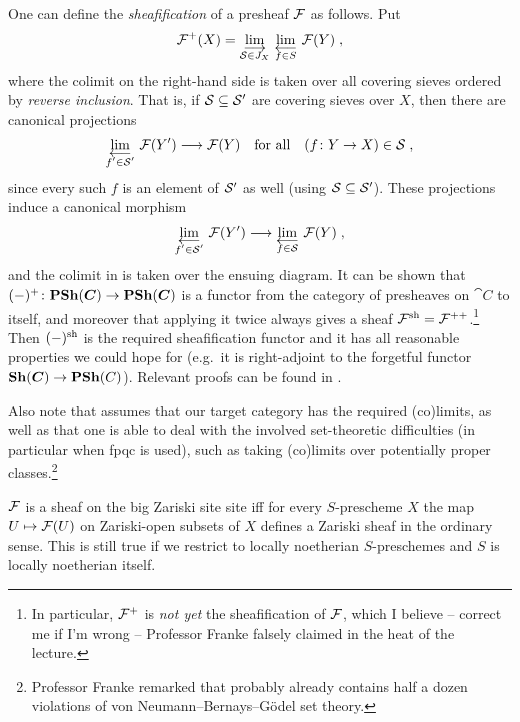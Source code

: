 \documentclass[a4paper,parskip=half,numbers=enddot, DIV=12]{scrreprt}
\begin{document}
\begin{rem}
	One can define the \emph{sheafification} of a presheaf $\mathcal{F}$ as follows. Put
	\begin{align}\lbl{eq:+construction}
		\Ff^+(X)=\colimit[\Ss\in J_X]\limit[f\in S]\Ff(Y)\;,
	\end{align}
	where the colimit on the right-hand side is taken over all covering sieves ordered by \emph{reverse inclusion}. That is, if $\mathcal{S}\subseteq \mathcal{S}'$ are covering sieves over $X$, then there are canonical projections
	\begin{align*}
		\limit[f'\in \Ss']\Ff(Y')\morphism \Ff(Y)\quad\text{for all}\quad(f\colon Y\to X)\in \Ss\;,
	\end{align*}
	since every such $f$ is an element of $\mathcal{S}'$ as well (using $\mathcal{S}\subseteq \mathcal{S}'$). These projections induce a canonical morphism 
	\begin{align*}
		\limit[f'\in\Ss']\Ff(Y')\morphism\limit[f\in \Ss]\Ff(Y)\;,
	\end{align*}
	and the colimit in  is taken over the ensuing diagram. It can be shown that $(-)^+\colon \cat{PSh}(\cat C)\morphism\cat{PSh}(\cat C)$ is a functor from the category of presheaves on $\cat C$ to itself, and moreover that applying it twice always gives a sheaf $\mathcal{F}^{\mathrm{sh}}=\mathcal{F}^{++}$.\footnote{In particular, $\mathcal{F}^+$ is \emph{not yet} the sheafification of $\mathcal{F}$, which  I believe -- correct me if I'm wrong -- Professor Franke falsely claimed in the heat of the lecture.} Then $(-)^{\mathrm{sh}}$ is the required sheafification functor and it has all reasonable properties we could hope for (e.g.\ it is right-adjoint to the forgetful functor $\cat {Sh}(\cat C)\morphism\cat{PSh}(C)$). Relevant proofs can be found in \cite[]{stacks-project}.
	
	Also note that  assumes that our target category has the required (co)limits, as well as that one is able to deal with the involved set-theoretic difficulties (in particular when fpqc is used), such as taking (co)limits over potentially proper classes.\footnote{Professor Franke remarked that  probably already contains half a dozen violations of von Neumann--Bernays--Gödel set theory.}
\end{rem}
\begin{example}
	$\mathcal{F}$ is a sheaf on the big Zariski site site iff for every %
	$S$-prescheme $X$ the map $U\mapsto \mathcal{F}(U)$ on Zariski-open subsets of $X$ defines a Zariski sheaf in the ordinary sense. This is still true if we restrict to locally noetherian $S$-preschemes and $S$ is locally noetherian itself.
\end{example}
\end{document}
